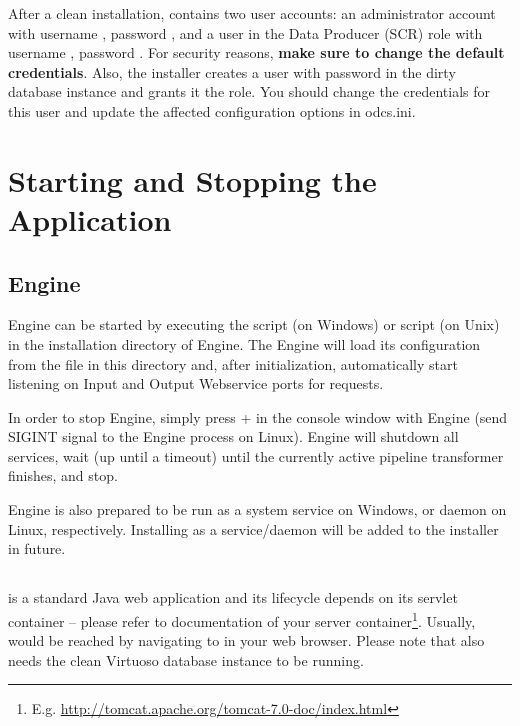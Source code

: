 After a clean installation, \FE contains two user accounts:  an administrator account with username , password , and a user in the Data Producer (SCR) role with username , password . For security reasons, \textbf{make sure to change the default credentials}. Also, the installer creates a user  with password  in the dirty database instance and grants it the  role. You should change the credentials for this user and update the affected  configuration options in odcs.ini. 


\chapter{Starting and Stopping the Application}
\section{Engine}
\odcs Engine can be started by executing the  script (on Windows) or  script (on Unix) in the installation directory of \odcs Engine. The Engine will load its configuration from the  file in this directory and, after initialization, automatically start listening on Input and Output Webservice ports for requests.

In order to stop Engine, simply press + in the console window with Engine (send SIGINT signal to the Engine process on Linux). Engine will shutdown all services, wait (up until a timeout) until the currently active pipeline transformer finishes, and stop.

Engine is also prepared to be run as a system service on Windows, or daemon on Linux, respectively. Installing \odcs as a service/daemon will be added to the installer in future.

\section{\FE}
\FE is a standard Java web application and its lifecycle depends on its servlet container -- please refer to documentation of your server container\footnote{E.g. \url{http://tomcat.apache.org/tomcat-7.0-doc/index.html}}. Usually, \FE would be reached by navigating to  in your web browser. Please note that \FE also needs the clean Virtuoso database instance to be running.

